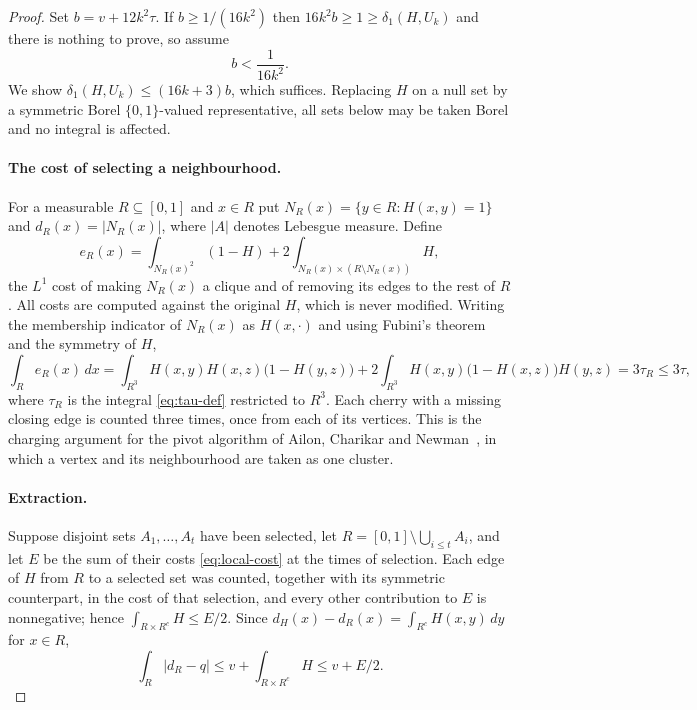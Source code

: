 \documentclass[11pt]{article}
\theoremstyle{remark}
\newcommand{\abs}[1]{\left\lvert #1\right\rvert}
\begin{document}
\begin{proof}
Set $b=v+12k^2\tau$. If $b\geq1/(16k^2)$ then
$16k^2b\geq1\geq\delta_1(H,U_k)$ and there is nothing to prove, so
assume
\begin{equation}\label{eq:small-b}
 b<\frac{1}{16k^2}.
\end{equation}
We show $\delta_1(H,U_k)\leq(16k+3)b$, which suffices. Replacing $H$ on a
null set by a symmetric Borel $\{0,1\}$-valued representative, all sets
below may be taken Borel and no integral is affected.

\paragraph{The cost of selecting a neighbourhood.}
For a measurable $R\subseteq[0,1]$ and $x\in R$ put
$N_R(x)=\{y\in R:H(x,y)=1\}$ and $d_R(x)=\abs{N_R(x)}$, where $\abs A$
denotes Lebesgue measure. Define
\begin{equation}\label{eq:local-cost}
 e_R(x)=\int_{N_R(x)^2}(1-H)
       +2\int_{N_R(x)\times(R\setminus N_R(x))}H,
\end{equation}
the $L^1$ cost of making $N_R(x)$ a clique and of removing its edges to
the rest of $R$. All costs are computed against the original $H$, which
is never modified. Writing the membership indicator of $N_R(x)$ as
$H(x,\cdot)$ and using Fubini's theorem and the symmetry of $H$,
\begin{equation}\label{eq:average-cost}
 \int_Re_R(x)\,dx
 =\int_{R^3}H(x,y)H(x,z)\bigl(1-H(y,z)\bigr)
 +2\int_{R^3}H(x,y)\bigl(1-H(x,z)\bigr)H(y,z)
 =3\tau_R\leq3\tau,
\end{equation}
where $\tau_R$ is the integral \eqref{eq:tau-def} restricted to $R^3$.
Each cherry with a missing closing edge is counted three times, once from
each of its vertices. This is the charging argument for the pivot
algorithm of Ailon, Charikar and Newman~\cite{ailon2008aggregating}, in
which a vertex and its neighbourhood are taken as one cluster.

\paragraph{Extraction.}
Suppose disjoint sets $A_1,\ldots,A_t$ have been selected, let
$R=[0,1]\setminus\bigcup_{i\leq t}A_i$, and let $E$ be the sum of their
costs \eqref{eq:local-cost} at the times of selection. Each edge of $H$
from $R$ to a selected set was counted, together with its symmetric
counterpart, in the cost of that selection, and every other contribution
to $E$ is nonnegative; hence $\int_{R\times R^c}H\leq E/2$. Since
$d_H(x)-d_R(x)=\int_{R^c}H(x,y)\,dy$ for $x\in R$,
\begin{equation}\label{eq:remaining-degree}
 \int_R\abs{d_R-q}\leq v+\int_{R\times R^c}H\leq v+E/2 .
\end{equation}


\end{proof}
\end{document}
